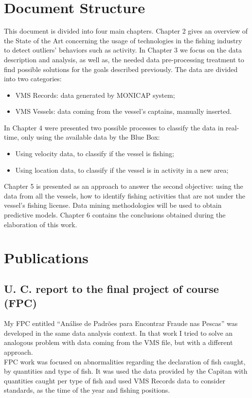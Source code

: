 \section{Document Structure} %
\label{sec:work_structure}
This document is divided into four main chapters. Chapter 2 gives an overview of the State of the Art concerning the usage of technologies in the fishing industry to detect outliers’ behaviors such as activity. In Chapter 3 we focus on the data description and analysis, as well as, the needed data pre-processing treatment to find possible solutions for the goals described previously. The data are divided into two categories:
\begin{itemize}
\item VMS Records: data generated by MONICAP system;
\item VMS Vessels: data coming from the vessel’s captains, manually inserted.
\end{itemize}
In Chapter 4 were presented two possible processes to classify the data in real-time, only using the available data by the Blue Box:
\begin{itemize}
\item    Using velocity data, to classify if the vessel is fishing;
\item    Using location data, to classify if the vessel is in activity in a new area;
\end{itemize}
Chapter 5 is presented as an approach to answer the second objective: using the data from all the vessels, how to identify fishing activities that are not under the vessel’s fishing license. Data mining methodologies will be used to obtain predictive models.
Chapter 6 contains the conclusions obtained during the elaboration of this work.


\section{Publications} %
\label{sec:publications}

\subsection{U. C. report to the final project of course (FPC)} %
\label{sub:fpc}
My FPC entitled “Análise de Padrões para Encontrar Fraude nas Pescas” was developed in the same data analysis context. In that work I tried to solve an analogous problem with data coming from the VMS file, but with a different approach.\\
FPC work was focused on abnormalities regarding the declaration of fish caught, by quantities and type of fish. It was used the data provided by the Capitan with quantities caught per type of fish and used VMS Records data to consider standards, as the time of the year and fishing positions.

